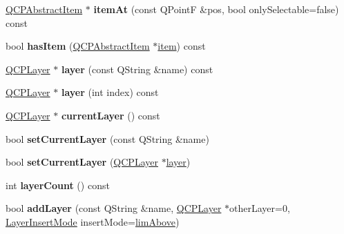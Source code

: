 \begin{DoxyCompactItemize}
\hyperlink{class_q_c_p_abstract_item}{Q\+C\+P\+Abstract\+Item} $\ast$ {\bfseries item\+At} (const Q\+PointF \&pos, bool only\+Selectable=false) const
\item 
\mbox{\label{class_q_custom_plot_af0b57f35646079f93fa6161a65b36109}} 
bool {\bfseries has\+Item} (\hyperlink{class_q_c_p_abstract_item}{Q\+C\+P\+Abstract\+Item} $\ast$\hyperlink{class_q_custom_plot_ac042f2e78edd228ccf2f26b7fe215239}{item}) const
\item 
\mbox{\label{class_q_custom_plot_a5e17033ededea7e1c6689b6782e1456f}} 
\hyperlink{class_q_c_p_layer}{Q\+C\+P\+Layer} $\ast$ {\bfseries layer} (const Q\+String \&name) const
\item 
\mbox{\label{class_q_custom_plot_ab93a9ca99a3e6e5914b14bd05e1743e4}} 
\hyperlink{class_q_c_p_layer}{Q\+C\+P\+Layer} $\ast$ {\bfseries layer} (int index) const
\item 
\mbox{\label{class_q_custom_plot_a65121613d7d4d6d0a4e4ffa1eda36ba0}} 
\hyperlink{class_q_c_p_layer}{Q\+C\+P\+Layer} $\ast$ {\bfseries current\+Layer} () const
\item 
\mbox{\label{class_q_custom_plot_a73a6dc47c653bb6f8f030abca5a11852}} 
bool {\bfseries set\+Current\+Layer} (const Q\+String \&name)
\item 
\mbox{\label{class_q_custom_plot_a23a4d3cadad1a0063c5fe19aac5659e6}} 
bool {\bfseries set\+Current\+Layer} (\hyperlink{class_q_c_p_layer}{Q\+C\+P\+Layer} $\ast$\hyperlink{class_q_custom_plot_a0a96244e7773b242ef23c32b7bdfb159}{layer})
\item 
\mbox{\label{class_q_custom_plot_afa45d61e65292026f4c58c9c88c2cef0}} 
int {\bfseries layer\+Count} () const
\item 
\mbox{\label{class_q_custom_plot_ad5255393df078448bb6ac83fa5db5f52}} 
bool {\bfseries add\+Layer} (const Q\+String \&name, \hyperlink{class_q_c_p_layer}{Q\+C\+P\+Layer} $\ast$other\+Layer=0, \hyperlink{class_q_custom_plot_a75a8afbe6ef333b1f3d47abb25b9add7}{Layer\+Insert\+Mode} insert\+Mode=\hyperlink{class_q_custom_plot_a75a8afbe6ef333b1f3d47abb25b9add7a56ffb40bbf81e9b5d869cffc88999a36}{lim\+Above})

\end{DoxyCompactItemize}
